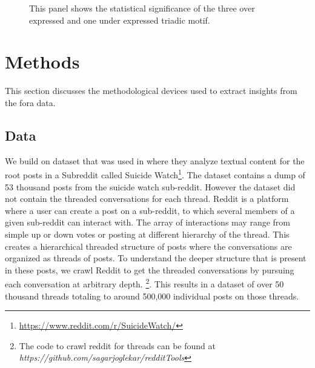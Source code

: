 \begin{figure}[!ht]
    
    
    \caption{This panel shows the statistical significance of the three over expressed and one under expressed triadic motif. 
    }
    \label{Sec:motif}
\end{figure}


\section{Methods}
This section discusses the methodological devices used to extract insights from the fora data.

\subsection{Data}
We build on dataset that was used in \cite{gkotsis2017characterisation} where they analyze textual content for the root posts in a Subreddit called Suicide Watch\footnote{\url{https://www.reddit.com/r/SuicideWatch/}}. The dataset contains a dump of 53 thousand posts from the suicide watch sub-reddit.
However the dataset did not contain the threaded conversations for each thread. Reddit is a platform where a user can create a post on a sub-reddit, to which several members of a given sub-reddit can interact with. The array of interactions may range from simple up or down votes or posting at different hierarchy of the thread. This creates a hierarchical threaded structure of posts where the conversations are organized as threads of posts. To understand the deeper structure that is present in these posts,  we crawl Reddit to get the threaded conversations by pursuing each conversation at arbitrary depth. \footnote{The code to crawl reddit for threads can be found at \textit{https://github.com/sagarjoglekar/redditTools}}. This results in a dataset of over 50 thousand threads totaling to around 500,000 individual posts on those threads.  

